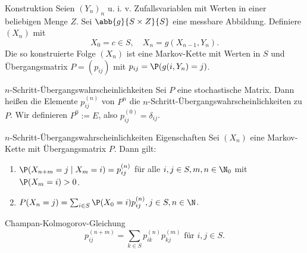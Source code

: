 \begin{karte}{Konstruktion}
    Seien \((Y_n)_n\) u. i. v. Zufallsvariablen mit Werten in einer beliebigen Menge \(Z\).
    Sei \(\abb{g}{S\times Z}{S}\) eine messbare Abbildung. 
    Definiere \( (X_n) \) mit 
    \[ X_0 = c \in S, \quad X_n = g(X_{n-1}, Y_n). \]
    Die so konstruierte Folge \((X_n)\) ist eine Markov-Kette mit Werten 
    in \(S\) und Übergangsmatrix \(P = (p_{ij})\) 
    mit \(p_{ij} = \P(g(i,Y_n) = j)\).
\end{karte}

\begin{karte}{\(n\)-Schritt-Übergangswahrscheinlichkeiten}
    Sei \(P\) eine stochastische Matrix. Dann heißen die Elemente 
    \(p_{ij}^{(n)}\) von \(P^n\) die \(n\)-Schritt-Übergangswahrscheinlichkeiten zu \(P\).
    Wir definieren \(P^0 := E\), also \(p_{ij}^{(0)} = \delta_{ij}\).
\end{karte}

\begin{karte}{\(n\)-Schritt-Übergangswahrscheinlichkeiten Eigenschaften}
    Sei \((X_n)\) eine Markov-Kette mit Übergangsmatrix \(P\). Dann gilt: 
    \begin{enumerate}
        \item \( \P(X_{n+m} = j \;|\; X_m = i) = p_{ij}^{(n)} \) für alle \(i,j\in S, m,n\in \N_0\) mit \(\P(X_m = i)>0\).
        \item \(P(X_n = j) = \sum_{i\in S} \P(X_0 = i) p_{ij}^{(n)}, j\in S, n\in \N\).
    \end{enumerate}
\end{karte}

\begin{karte}{Champan-Kolmogorov-Gleichung}
    \[ p_{ij}^{(n+m)} = \sum_{k\in S} p_{ik}^{(n)} p_{kj}^{(m)} \text{ für } i,j\in S. \]
\end{karte}